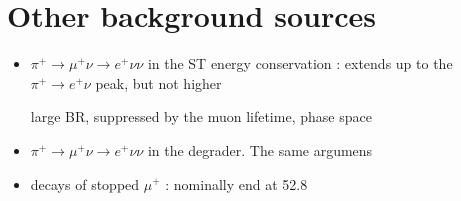 \section {Other background sources}
\begin{itemize}
\item
  $\pi^+ \to \mu^+ \nu \to e^+ \nu \nu $ in the ST
  energy conservation : extends up to the $\pi^+ \to e^+ \nu$ peak, but not higher
  
  large BR, suppressed by the muon lifetime, phase space
  
\item
  $\pi^+ \to \mu^+ \nu \to e^+ \nu \nu $ in the degrader. The same argumens
\item
  decays of stopped $\mu^+$ : nominally end at 52.8
\end{itemize}

